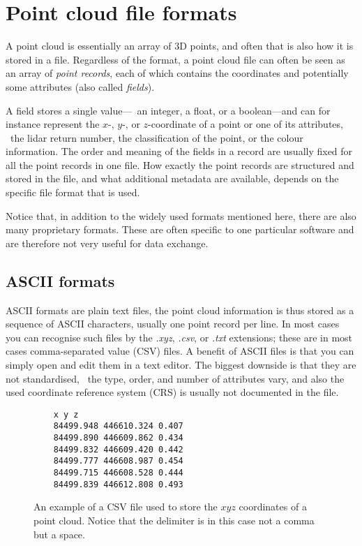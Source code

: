
\setchapterpreamble[u]{\margintoc}

\graphicspath{{appendices/pcformats/figs/}}

\chapter{Point cloud file formats}%
\label{app:pcformats}


A point cloud is essentially an array of 3D points, and often that is also how it is stored in a file.
Regardless of the format, a point cloud file can often be seen as an array of \emph{point records}, each of which contains the coordinates and potentially some attributes (also called \emph{fields}).

A field stores a single value---\eg\ an integer, a float, or a boolean---and can for instance represent the $x$-, $y$-, or $z$-coordinate of a point or one of its attributes, \eg\ the lidar return number, the classification of the point, or the colour information.
The order and meaning of the fields in a record are usually fixed for all the point records in one file.
How exactly the point records are structured and stored in the file, and what additional metadata are available, depends on the specific file format that is used.

Notice that, in addition to the widely used formats mentioned here, there are also many proprietary formats. 
These are often specific to one particular software and are therefore not very useful for data exchange.


%
\section{ASCII formats}

ASCII formats are plain text files, the point cloud information is thus stored as a sequence of ASCII characters, usually one point record per line.
In most cases you can recognise such files by the \emph{.xyz}, \emph{.csv}, or \emph{.txt} extensions; these are in most cases comma-separated value (CSV) files.
A benefit of ASCII files is that you can simply open and edit them in a text editor.
The biggest downside is that they are not standardised, \ie\ the type, order, and number of attributes vary, and also the used coordinate reference system (CRS) is usually not documented in the file.
\begin{figure}
  \begin{verbatim}
    x y z
    84499.948 446610.324 0.407
    84499.890 446609.862 0.434
    84499.832 446609.420 0.442
    84499.777 446608.987 0.454
    84499.715 446608.528 0.444
    84499.839 446612.808 0.493
  \end{verbatim}
  \caption{An example of a CSV file used to store the $xyz$ coordinates of a point cloud. Notice that the delimiter is in this case not a comma but a space.}%
\label{fig:csv}
\end{figure}


